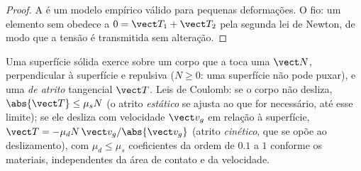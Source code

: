 \begin{proof}
A  é um modelo empírico válido para pequenas deformações. O
fio: um elemento sem  obedece a $0 = \vect T_1 + \vect T_2$ pela
segunda lei de Newton, de modo que a tensão é transmitida sem alteração.
\end{proof}

\begin{proposition}\label{prop:b1:newton-dynamics:friction}
Uma superfície sólida exerce sobre um corpo que a toca uma \emph{}
$\vect N$, perpendicular à superfície e repulsiva ($N \geq 0$: uma
superfície não pode puxar), e uma \emph{ de atrito} tangencial $\vect T$.
Leis de Coulomb: se o corpo não desliza, $\abs{\vect T} \leq \mu_s N$
(o atrito \emph{estático} se ajusta ao que for necessário, até esse limite);
se ele desliza com velocidade $\vect v_g$ em relação à superfície,
$\vect T = -\mu_d N\,\vect v_g/\abs{\vect v_g}$ (atrito \emph{cinético},
que se opõe ao deslizamento), com $\mu_d \leq \mu_s$ coeficientes da ordem de
$0.1$ a $1$ conforme os materiais, independentes da área de
contato e da velocidade.
\end{proposition}
\admitted

